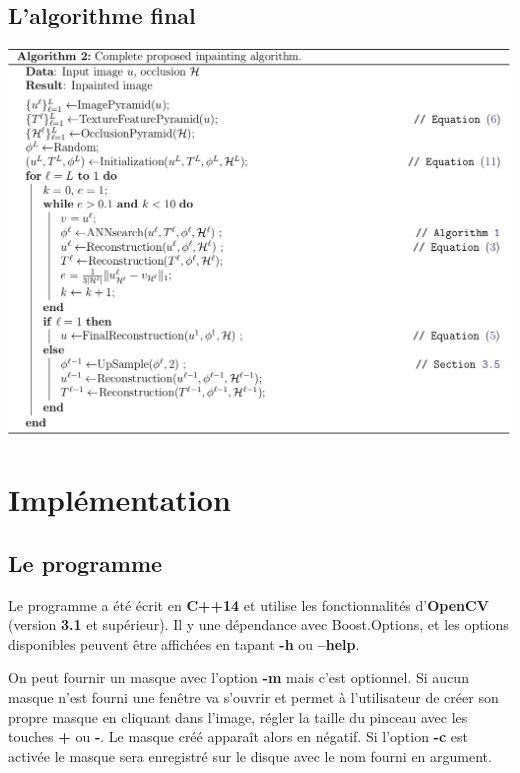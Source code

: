 \documentclass[a4paper, 10pt]{article}
\begin{document}
\subsection{L'algorithme final}

\begin{center}
\includegraphics[scale=0.30]{inpainting_algo.png} 
\end{center}

\section{Implémentation}

\subsection{Le programme}

Le programme a été écrit en \textbf{C++14} et utilise les fonctionnalités d'\textbf{OpenCV} (version \textbf{3.1} et supérieur). Il y une dépendance avec Boost.Options, et les options disponibles peuvent être affichées en tapant \textbf{-h} ou \textbf{--help}.  
  
On peut fournir un masque avec l'option \textbf{-m} mais c'est optionnel. Si aucun masque n'est fourni une fenêtre va s'ouvrir et permet à l'utilisateur de créer son propre masque en cliquant dans l'image, régler la taille du pinceau avec les touches \textbf{+} ou \textbf{-}. Le masque créé apparaît alors en négatif. Si l'option \textbf{-c} est activée le masque sera enregistré sur le disque avec le nom fourni en argument.
  
\end{document}
